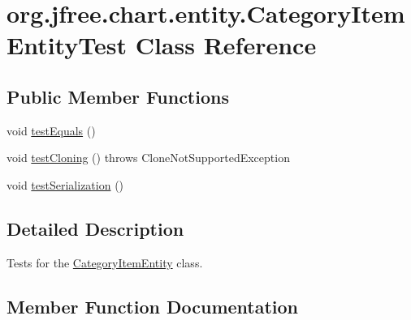 \hypertarget{classorg_1_1jfree_1_1chart_1_1entity_1_1_category_item_entity_test}{}\section{org.\+jfree.\+chart.\+entity.\+Category\+Item\+Entity\+Test Class Reference}
\label{classorg_1_1jfree_1_1chart_1_1entity_1_1_category_item_entity_test}
\subsection*{Public Member Functions}
\begin{DoxyCompactItemize}
\item 
void \mbox{\hyperlink{classorg_1_1jfree_1_1chart_1_1entity_1_1_category_item_entity_test_a755dd1a583199556cf9543ac32695dc1}{test\+Equals}} ()
\item 
void \mbox{\hyperlink{classorg_1_1jfree_1_1chart_1_1entity_1_1_category_item_entity_test_a5fe600eb311f24027e59aa7b1c1a9560}{test\+Cloning}} ()  throws Clone\+Not\+Supported\+Exception 
\item 
void \mbox{\hyperlink{classorg_1_1jfree_1_1chart_1_1entity_1_1_category_item_entity_test_ac5e32a3d74ffa7380041fdb5dae68209}{test\+Serialization}} ()
\end{DoxyCompactItemize}


\subsection{Detailed Description}
Tests for the \mbox{\hyperlink{classorg_1_1jfree_1_1chart_1_1entity_1_1_category_item_entity}{Category\+Item\+Entity}} class. 

\subsection{Member Function Documentation}
\mbox{\label{classorg_1_1jfree_1_1chart_1_1entity_1_1_category_item_entity_test_a5fe600eb311f24027e59aa7b1c1a9560}} 
